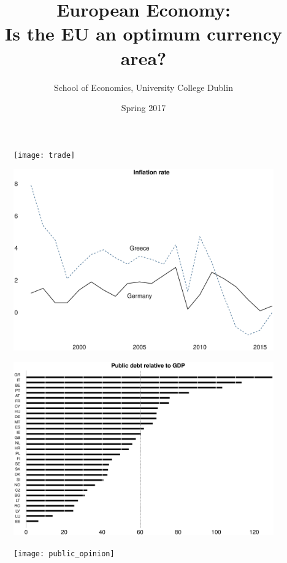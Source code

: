 \documentclass{beamer}
\title{European Economy:\\ Is the EU an optimum currency area?}
\author{School of Economics, University College Dublin}
\date{Spring 2017}
\begin{document}
\begin{frame}
\titlepage  
\end{frame}


\begin{frame}
  \begin{figure}
    \texttt{[image: trade]}
  \end{figure}
\end{frame}

\begin{frame}
  \begin{figure}
    \includegraphics[scale=.3]{inflation}
  \end{figure}
\end{frame}

\begin{frame}
  \begin{figure}
    \includegraphics[scale=.3]{public_debt}
  \end{figure}
\end{frame}

\begin{frame}
  \begin{figure}
    \texttt{[image: public\_opinion]}
  \end{figure}
\end{frame}

\end{document}
